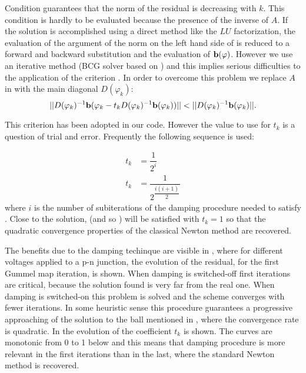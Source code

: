 Condition  guarantees that the norm of the residual is decreasing with $k$.
This condition is hardly to be evaluated because the presence of the inverse of $A$. If the solution is accomplished using a direct method like the $LU$ factorization, the evaluation of the argument of the norm on the left hand side of  is reduced to a forward and backward substitution and the evaluation of $\mathbf{b}(\varphi)$. However we use an iterative method (BCG solver based on \cite{NumericalRecipes}) and this implies serious difficulties to the application of the criterion . In order to overcome this problem we replace $A$ in  with  the main diagonal $D(\varphi_k)$:
\begin{equation}
\label{eq: easy criterion}
||D(\varphi_k)^{-1}\vect{b}(\varphi_k-t_kD(\varphi_k)^{-1}\vect{b}(\varphi_k))||<||D(\varphi_k)^{-1}\vect{b}(\varphi_k)||.
\end{equation}

This criterion has been adopted in our code. However the value to use for $t_k$ is a question of trial and error. Frequently the following sequence is used:

\begin{align}
t_k & = \dfrac{1}{2^i} \\
t_k & = \dfrac{1}{2^{\dfrac{i(i+1)}{2}}}  
\end{align}
where $i$ is the number of subiterations of the damping procedure needed to satisfy . Close to the solution,  (and so ) will be satisfied with $t_k=1$ so that the quadratic convergence properties of the classical Newton method are recovered.

The benefits due to the damping techinque are visible in , where for different voltages applied to a p-n junction, the evolution of the residual, for the first Gummel map iteration, is shown. When damping is switched-off first iterations are critical, because the solution found is very far from the real one. When damping is switched-on this problem is solved and the scheme converges with fewer iterations. In some heuristic sense this procedure guarantees a progressive approaching of the solution to the ball mentioned in , where the convergence rate is quadratic. In  the evolution of the coefficient $t_k$ is shown. 
The curves are monotonic from 0 to 1 below and this means that damping procedure is more relevant in the first iterations than in the last, where the standard Newton method is recovered.

